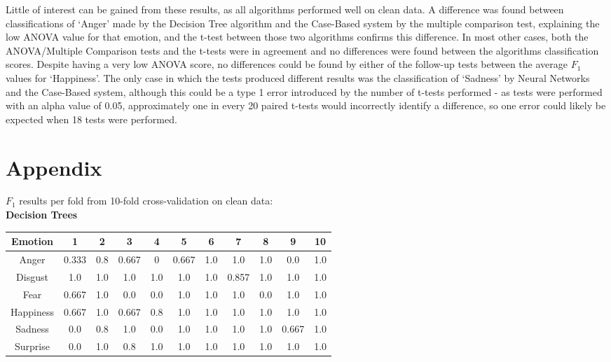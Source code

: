 \documentclass[a4paper]{article}
\begin{document}
 Little of interest can be gained from these results, as all algorithms performed well on clean data. A difference was found
 between classifications of `Anger' made by the Decision Tree algorithm and the Case-Based system by the multiple comparison
 test, explaining the low ANOVA value for that emotion, and the t-test between those two algorithms confirms this difference.
 In most other cases, both the ANOVA/Multiple Comparison tests and the t-tests were in agreement and no differences were found
 between the algorithms classification scores. Despite having a very low ANOVA score, no differences could be found by either
 of the follow-up tests between the average $F_1$ values for `Happiness'. The only case in which the tests produced different
 results was the classification of `Sadness' by Neural Networks and the Case-Based system, although this could be a type 1 error
 introduced by the number of t-tests performed - as tests were performed with an alpha value of 0.05, approximately one in every
 20 paired t-tests would incorrectly identify a difference, so one error could likely be expected when 18 tests were performed.\\
  
\newpage
\section{Appendix}

$F_1$ results per fold from 10-fold cross-validation on clean data:\\

{\bf Decision Trees}\\

\begin{center}
  \begin{tabular}{|c|cccccccccc|}
  \hline
    Emotion & 1 & 2 & 3 & 4 & 5 & 6 & 7 & 8 & 9 & 10 \\
    \hline
    Anger 	& 0.333 & 0.8 & 0.667 & 0 & 0.667 & 1.0 & 1.0 & 1.0 & 0.0 & 1.0 \\
	Disgust & 1.0 & 1.0 & 1.0 & 1.0 & 1.0 & 1.0 & 0.857 & 1.0 & 1.0 & 1.0 \\
	Fear 	& 0.667 & 1.0 & 0.0 & 0.0 & 1.0 & 1.0 & 1.0 & 0.0 & 1.0 & 1.0 \\
	Happiness 	& 0.667 & 1.0 & 0.667 & 0.8 & 1.0 & 1.0 & 1.0 & 1.0 & 1.0 & 1.0 \\
	Sadness 	& 0.0 & 0.8 & 1.0 & 0.0 & 1.0 & 1.0 & 1.0 & 1.0 & 0.667 & 1.0 \\
	Surprise 	& 0.0 & 1.0 & 0.8 & 1.0 & 1.0 & 1.0 & 1.0 & 1.0 & 1.0 & 1.0 \\
	\hline
  \end{tabular}\\
  \end{center}
  
\end{document}
